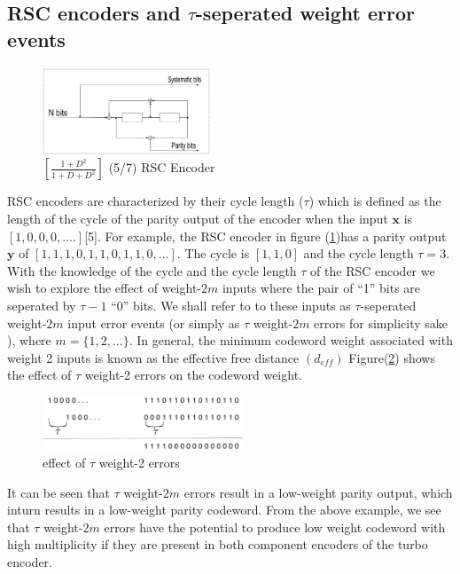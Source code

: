 \documentclass[twoside]{jarticle}
\begin{document}
  \subsection{RSC encoders and $\tau$-seperated weight error events}
\begin{figure}[h!]
\centering
		\includegraphics[width=5.0cm]{RSCExample3.eps}
		\caption{$[\frac{1+D^2}{1+D+D^2}]$ (5/7) RSC Encoder}
		\label{RSC}
		\end{figure}
RSC encoders  are
characterized by their cycle length ($\tau$) which is defined as the length of the cycle
 of the parity output of the encoder when the input $\mathbf{x}$ is $[1,0,0,0,....]$[5]. 
For example, the RSC encoder in figure (\ref{RSC})has a parity output $\mathbf{y}$ of 
$[1,1,1,0,1,1,0,1,1,0,...]$. The cycle is $[1,1,0]$ and
the cycle length $\tau=3$. With the knowledge of the cycle and the cycle length $\tau$
of the RSC encoder we wish to explore the effect of weight-$2m$ inputs where the pair of
``1'' bits
 are seperated by $\tau-1$ ``0'' bits. We shall refer to to these inputs as
 $\tau$-seperated weight-$2m$ input error events (or simply as $\tau$ weight-$2m$ errors for
 simplicity sake ), where $m=\{1,2,...\}$. 
In general, the minimum codeword weight associated with weight 2 inputs is known as the effective free distance $(d_{eff})$\cite{ref5}
 Figure(\ref{RSC3})  shows the effect of $\tau$ weight-2 errors on the codeword weight.
 
\begin{figure}[h!]
\centering
		\includegraphics[width=6cm]{RSCExample.eps}
		\caption{ effect of $\tau$ weight-2 errors}
		\label{RSC3}
		\end{figure}
	
 It can be seen that  $\tau$ weight-$2m$ errors result in a low-weight parity output, which inturn results
in a low-weight parity codeword. 
 From the above example, we see that $\tau$ weight-$2m$ errors have the potential to
produce low weight codeword with high multiplicity if they are present in both 
component encoders of the turbo encoder. 
\vspace{-4mm}
\end{document}
